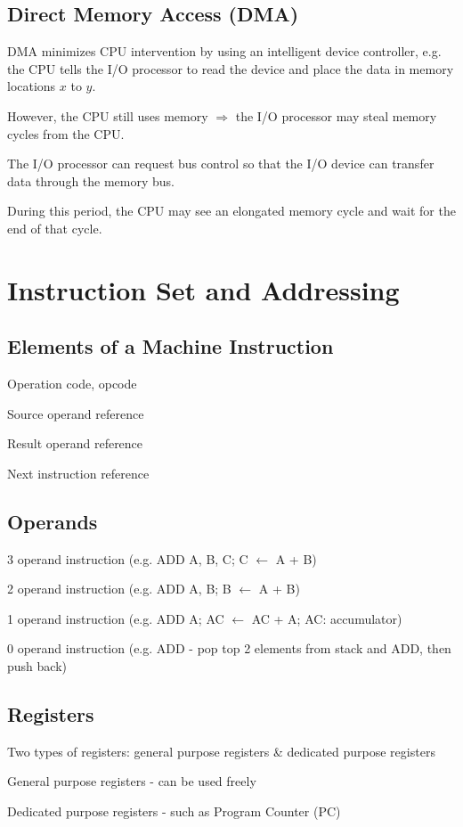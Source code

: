 \documentclass[11pt,a4paper]{article}
\begin{document}
\subsection{Direct Memory Access (DMA)}
DMA minimizes CPU intervention by using an intelligent device controller, e.g. the CPU tells the I/O processor to read the device and place the data in memory locations $x$ to $y$. \par
However, the CPU still uses memory $\Rightarrow$ the I/O processor may steal memory cycles from the CPU. \par
The I/O processor can request bus control so that the I/O device can transfer data through the memory bus. \par
During this period, the CPU may see an elongated memory cycle and wait for the end of that cycle. \par
{}

\section{Instruction Set and Addressing}
\subsection{Elements of a Machine Instruction}
\quad Operation code, opcode \par
\quad Source operand reference \par
\quad Result operand reference \par
\quad Next instruction reference \par

\subsection{Operands}
3 operand instruction (e.g. ADD A, B, C; C $\leftarrow$ A + B) \par
2 operand instruction (e.g. ADD A, B; B $\leftarrow$ A + B) \par
1 operand instruction (e.g. ADD A; AC $\leftarrow$ AC + A; AC: accumulator) \par
0 operand instruction (e.g. ADD - pop top 2 elements from stack and ADD, then push back)

\subsection{Registers}
Two types of registers: general purpose registers \& dedicated purpose registers \par
General purpose registers - can be used freely \par
Dedicated purpose registers - such as Program Counter (PC) \par
\end{document}
